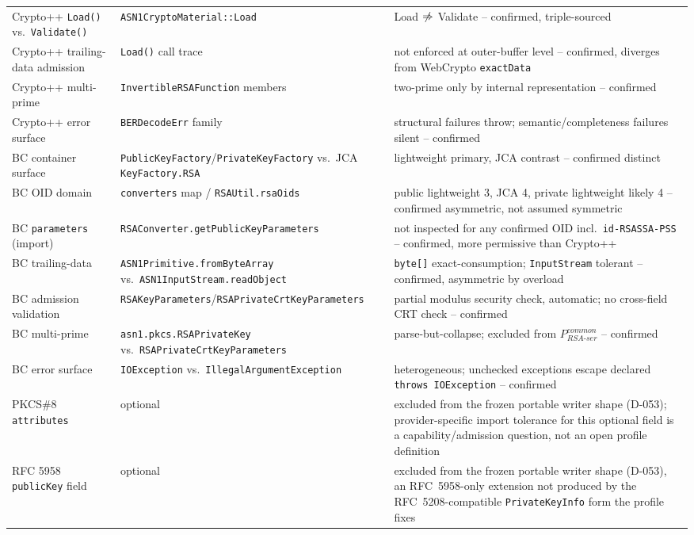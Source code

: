 \documentclass[11pt,a4paper]{article}
\begin{document}
\begin{center}
\begin{tabularx}{\textwidth}{@{}l l >{\raggedright\arraybackslash}X@{}}
Crypto++ \texttt{Load()} vs.\ \texttt{Validate()} & \texttt{ASN1CryptoMaterial::Load} & Load $\centernot\Rightarrow$ Validate -- confirmed, triple-sourced \\
Crypto++ trailing-data admission & \texttt{Load()} call trace & not enforced at outer-buffer level -- confirmed, diverges from WebCrypto \texttt{exactData} \\
Crypto++ multi-prime & \texttt{InvertibleRSAFunction} members & two-prime only by internal representation -- confirmed \\
Crypto++ error surface & \texttt{BERDecodeErr} family & structural failures throw; semantic/completeness failures silent -- confirmed \\
BC container surface & \texttt{PublicKeyFactory}/\texttt{PrivateKeyFactory} vs.\ JCA \texttt{KeyFactory.RSA} & lightweight primary, JCA contrast -- confirmed distinct \\
BC OID domain & \texttt{converters} map / \texttt{RSAUtil.rsaOids} & public lightweight 3, JCA 4, private lightweight likely 4 -- confirmed asymmetric, not assumed symmetric \\
BC \texttt{parameters} (import) & \texttt{RSAConverter.getPublicKeyParameters} & not inspected for any confirmed OID incl.\ \texttt{id-RSASSA-PSS} -- confirmed, more permissive than Crypto++ \\
BC trailing-data & \texttt{ASN1Primitive.fromByteArray} vs.\ \texttt{ASN1InputStream.readObject} & \texttt{byte[]} exact-consumption; \texttt{InputStream} tolerant -- confirmed, asymmetric by overload \\
BC admission validation & \texttt{RSAKeyParameters}/\texttt{RSAPrivateCrtKeyParameters} & partial modulus security check, automatic; no cross-field CRT check -- confirmed \\
BC multi-prime & \texttt{asn1.pkcs.RSAPrivateKey} vs.\ \texttt{RSAPrivateCrtKeyParameters} & parse-but-collapse; excluded from $P_{RSA\text{-}ser}^{common}$ -- confirmed \\
BC error surface & \texttt{IOException} vs.\ \texttt{IllegalArgumentException} & heterogeneous; unchecked exceptions escape declared \texttt{throws IOException} -- confirmed \\
PKCS\#8 \texttt{attributes} & optional & excluded from the frozen portable writer shape (D-053); provider-specific import tolerance for this optional field is a capability/admission question, not an open profile definition \\
RFC 5958 \texttt{publicKey} field & optional & excluded from the frozen portable writer shape (D-053), an RFC~5958-only extension not produced by the RFC~5208-compatible \texttt{PrivateKeyInfo} form the profile fixes \\
\bottomrule
\end{tabularx}
\end{center}
\end{document}
